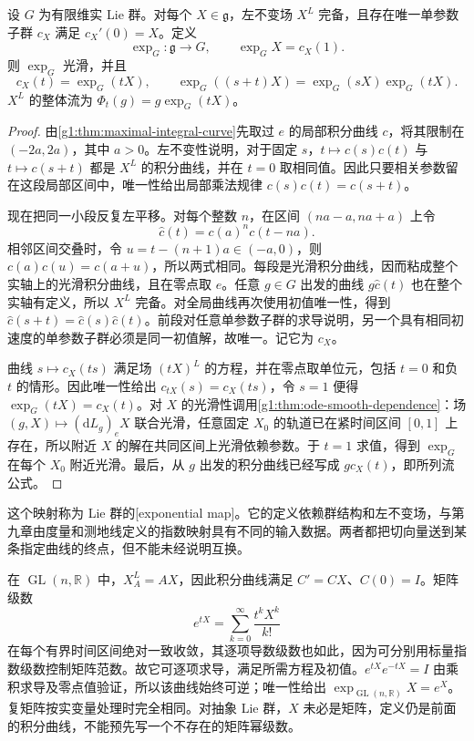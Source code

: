 \begin{theorem}\label{g1:thm:lie-exponential}
	设 \(G\) 为有限维实 Lie 群。对每个 \(X\in\mathfrak g\)，左不变场 \(X^L\) 完备，且存在唯一单参数子群 \(c_X\) 满足 \(c_X'(0)=X\)。定义
	\[
		\exp_G:\mathfrak g\longrightarrow G,\qquad \exp_GX=c_X(1).
	\]
	则 \(\exp_G\) 光滑，并且
	\begin{equation}\label{g1:eq:one-parameter-exponential}
		c_X(t)=\exp_G(tX),\qquad
		\exp_G((s+t)X)=\exp_G(sX)\exp_G(tX).
	\end{equation}
	\(X^L\) 的整体流为 \(\Phi_t(g)=g\exp_G(tX)\)。
\end{theorem}
\begin{proof}
	由\cref{g1:thm:maximal-integral-curve}先取过 \(e\) 的局部积分曲线 \(c\)，将其限制在 \((-2a,2a)\)，其中 \(a>0\)。左不变性说明，对于固定 \(s\)，\(t\mapsto c(s)c(t)\) 与 \(t\mapsto c(s+t)\) 都是 \(X^L\) 的积分曲线，并在 \(t=0\) 取相同值。因此只要相关参数留在这段局部区间中，唯一性给出局部乘法规律 \(c(s)c(t)=c(s+t)\)。

	现在把同一小段反复左平移。对每个整数 \(n\)，在区间 \((na-a,na+a)\) 上令
	\[
		\widehat c(t)=c(a)^n c(t-na).
	\]
	相邻区间交叠时，令 \(u=t-(n+1)a\in(-a,0)\)，则 \(c(a)c(u)=c(a+u)\)，所以两式相同。每段是光滑积分曲线，因而粘成整个实轴上的光滑积分曲线，且在零点取 \(e\)。任意 \(g\in G\) 出发的曲线 \(g\widehat c(t)\) 也在整个实轴有定义，所以 \(X^L\) 完备。对全局曲线再次使用初值唯一性，得到 \(\widehat c(s+t)=\widehat c(s)\widehat c(t)\)。前段对任意单参数子群的求导说明，另一个具有相同初速度的单参数子群必须是同一初值解，故唯一。记它为 \(c_X\)。

	曲线 \(s\mapsto c_X(ts)\) 满足场 \((tX)^L\) 的方程，并在零点取单位元，包括 \(t=0\) 和负 \(t\) 的情形。因此唯一性给出 \(c_{tX}(s)=c_X(ts)\)，令 \(s=1\) 便得 \(\exp_G(tX)=c_X(t)\)。对 \(X\) 的光滑性调用\cref{g1:thm:ode-smooth-dependence}：场 \((g,X)\mapsto(\mathrm{d}L_g)_eX\) 联合光滑，任意固定 \(X_0\) 的轨道已在紧时间区间 \([0,1]\) 上存在，所以附近 \(X\) 的解在共同区间上光滑依赖参数。于 \(t=1\) 求值，得到 \(\exp_G\) 在每个 \(X_0\) 附近光滑。最后，从 \(g\) 出发的积分曲线已经写成 \(g c_X(t)\)，即所列流公式。
\end{proof}

这个映射称为 Lie 群的[exponential map]。它的定义依赖群结构和左不变场，与第九章由度量和测地线定义的指数映射具有不同的输入数据。两者都把切向量送到某条指定曲线的终点，但不能未经说明互换。

\begin{example}\label{g1:exm:matrix-exponential-series}
	在 \(\operatorname{GL}(n,\mathbb R)\) 中，\(X^L_A=AX\)，因此积分曲线满足 \(C'=CX\)、\(C(0)=I\)。矩阵级数
	\[
		e^{tX}=\sum_{k=0}^{\infty}\frac{t^kX^k}{k!}
	\]
	在每个有界时间区间绝对一致收敛，其逐项导数级数也如此，因为可分别用标量指数级数控制矩阵范数。故它可逐项求导，满足所需方程及初值。\(e^{tX}e^{-tX}=I\) 由乘积求导及零点值验证，所以该曲线始终可逆；唯一性给出 \(\exp_{\operatorname{GL}(n,\mathbb R)}X=e^X\)。复矩阵按实变量处理时完全相同。对抽象 Lie 群，\(X\) 未必是矩阵，定义仍是前面的积分曲线，不能预先写一个不存在的矩阵幂级数。
\end{example}

